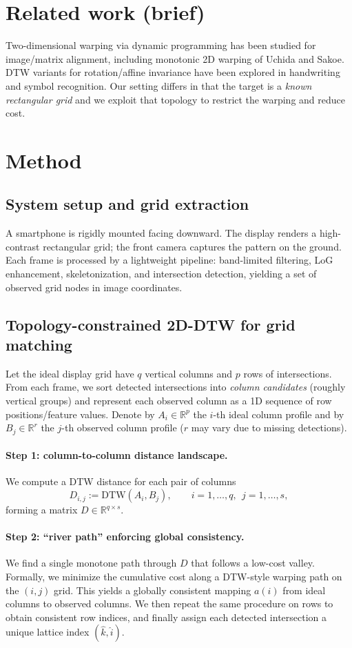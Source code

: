 \documentclass[runningheads]{llncs}
\begin{document}
\section{Related work (brief)}
Two-dimensional warping via dynamic programming has been studied for image/matrix alignment, including
monotonic 2D warping of Uchida and Sakoe.
DTW variants for rotation/affine invariance have been explored in handwriting and symbol recognition.
Our setting differs in that the target is a \emph{known rectangular grid} and we exploit that topology to
restrict the warping and reduce cost.

\section{Method}
\subsection{System setup and grid extraction}
A smartphone is rigidly mounted facing downward.
The display renders a high-contrast rectangular grid; the front camera captures the pattern on the ground.
Each frame is processed by a lightweight pipeline: band-limited filtering, LoG enhancement, skeletonization,
and intersection detection, yielding a set of observed grid nodes in image coordinates.

\subsection{Topology-constrained 2D-DTW for grid matching}
Let the ideal display grid have $q$ vertical columns and $p$ rows of intersections.
From each frame, we sort detected intersections into \emph{column candidates} (roughly vertical groups)
and represent each observed column as a 1D sequence of row positions/feature values.
Denote by $A_i\in\mathbb{R}^{p}$ the $i$-th ideal column profile and by $B_j\in\mathbb{R}^{r}$ the $j$-th observed
column profile ($r$ may vary due to missing detections).

\paragraph{Step 1: column-to-column distance landscape.}
We compute a DTW distance for each pair of columns
\[
D_{i,j} := \mathrm{DTW}(A_i,B_j),\qquad i=1,\dots,q,\ \ j=1,\dots,s,
\]
forming a matrix $D\in\mathbb{R}^{q\times s}$.

\paragraph{Step 2: ``river path'' enforcing global consistency.}
We find a single monotone path through $D$ that follows a low-cost valley.
Formally, we minimize the cumulative cost along a DTW-style warping path on the $(i,j)$ grid.
This yields a globally consistent mapping $a(i)$ from ideal columns to observed columns.
We then repeat the same procedure on rows to obtain consistent row indices, and finally assign each detected
intersection a unique lattice index $(\hat{k},\hat{i})$.
\end{document}
